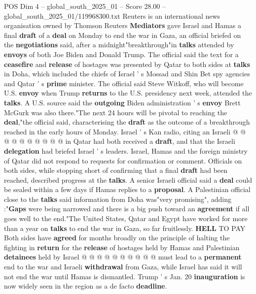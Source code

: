 \begin{textsample}{POS Dim 4 – global\_south\_2025\_01 – Score 28.00 – global\_south\_2025\_01/119968300.txt}  \label{ex:f4_pos_007}
Reuters is an international news organisation owned by Thomson Reuters \textbf{Mediators} gave Israel and Hamas a final \textbf{draft} of a \textbf{deal} on Monday to end the war in Gaza, an official briefed on the \textbf{negotiations} said, after a midnight"breakthrough"in \textbf{talks} attended by \textbf{envoys} of both Joe Biden and Donald Trump.
The official said the text for a \textbf{ceasefire} and \textbf{release} of hostages was presented by Qatar to both sides at \textbf{talks} in Doha, which included the chiefs of Israel ' s Mossad and Shin Bet spy agencies and Qatar ' s \textbf{prime} minister.
The official said Steve Witkoff, who will become U.S. \textbf{envoy} when Trump \textbf{returns} to the U.S. presidency next week, attended the \textbf{talks}.
A U.S. source said the \textbf{outgoing} Biden administration ' s \textbf{envoy} Brett McGurk was also there."The next 24 hours will be pivotal to reaching the \textbf{deal},"the official said, characterising the \textbf{draft} as the outcome of a breakthrough reached in the early hours of Monday.
Israel ' s Kan radio, citing an Israeli @ @ @ @ @ @ @ @ @ @ in Qatar had both received a \textbf{draft}, and that the Israeli \textbf{delegation} had briefed Israel ' s leaders.
Israel, Hamas and the foreign ministry of Qatar did not respond to requests for confirmation or comment.
Officials on both sides, while stopping short of confirming that a final \textbf{draft} had been reached, described progress at the \textbf{talks}.
A senior Israeli official said a \textbf{deal} could be sealed within a few days if Hamas replies to a \textbf{proposal}.
A Palestinian official close to the \textbf{talks} said information from Doha was"very promising", adding :"\textbf{Gaps} were being narrowed and there is a big push toward an \textbf{agreement} if all goes well to the end."The United States, Qatar and Egypt have worked for more than a year on \textbf{talks} to end the war in Gaza, so far fruitlessly. \textbf{HELL} TO PAY Both sides have \textbf{agreed} for months broadly on the principle of halting the fighting in \textbf{return} for the \textbf{release} of hostages held by Hamas and Palestinian \textbf{detainees} held by Israel @ @ @ @ @ @ @ @ @ @ must lead to a \textbf{permanent} end to the war and Israeli \textbf{withdrawal} from Gaza, while Israel has said it will not end the war until Hamas is dismantled.
Trump ' s Jan. 20 \textbf{inauguration} is now widely seen in the region as a de facto \textbf{deadline}.

\end{textsample}
